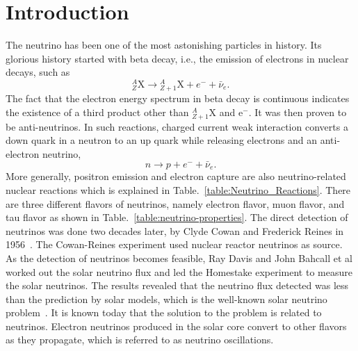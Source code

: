 \chapter{Introduction}
\label{introduction}

The neutrino has been one of the most astonishing particles in history. Its glorious history started with beta decay, i.e., the emission of electrons in nuclear decays, such as
\begin{equation*}
{}^A_Z \mathrm X \to {}_{Z+1}^A\mathrm X + e^- +\bar \nu_e .
\end{equation*}
The fact that the electron energy spectrum in beta decay is continuous indicates the existence of a third product other than ${}^{A}_{Z+1}\mathrm X$ and $\mathrm e^-$. It was then proven to be anti-neutrinos. In such reactions, charged current weak interaction converts a down quark in a neutron to an up quark while releasing electrons and an anti-electron neutrino,
\begin{equation}
n\to p + e^- + \bar \nu_e .
\end{equation}
More generally, positron emission and electron capture are also neutrino-related nuclear reactions which is explained in Table.~\ref{table:Neutrino_Reactions}. There are three different flavors of neutrinos, namely electron flavor, muon flavor, and tau flavor as shown in Table.~\ref{table:neutrino-properties}. The direct detection of neutrinos was done two decades later, by Clyde Cowan and Frederick Reines in 1956~\cite{Cowan1956}. The Cowan-Reines experiment used nuclear reactor neutrinos as source. As the detection of neutrinos becomes feasible, Ray Davis and John Bahcall et al worked out the solar neutrino flux and led the Homestake experiment to measure the solar neutrinos. The results revealed that the neutrino flux detected was less than the prediction by solar models, which is the well-known solar neutrino problem~\cite{Bahcall1973}. It is known today that the solution to the problem is related to neutrinos. Electron neutrinos produced in the solar core convert to other flavors as they propagate, which is referred to as neutrino oscillations.



